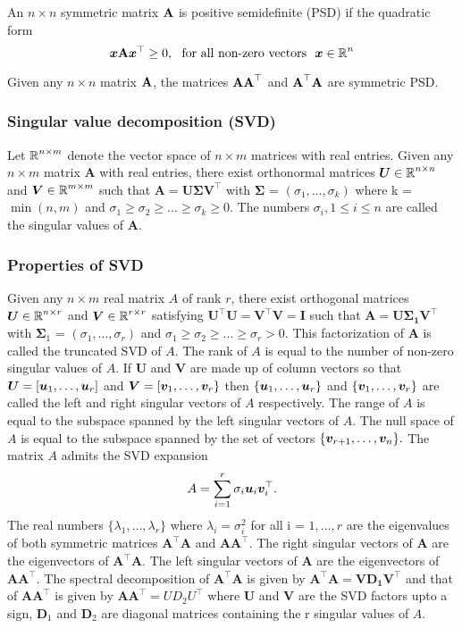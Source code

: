 An $n\times n$ symmetric matrix $\textbf{A}$ is positive semidefinite (PSD) if the quadratic form
\[
\vect{x} \Bm{A} \vect{x}^{\top} \geq 0,\ \ \text{for all non-zero vectors} \ \ \vect{x} \in \R^{n}
\]

Given any $n\times n$ matrix $\textbf{A}$, the matrices $\textbf{A}\textbf{A}^{\top}$
and $\textbf{A}^{\top}\textbf{A}$ are symmetric PSD.

\subsubsection{Singular value decomposition (SVD)}
Let $\operatorname{\mathbb{R}}^{n \times m}$ denote the vector space of $n \times m$ matrices with real entries. Given any $n\times m$ matrix $\bm{A}$ with real entries, there exist orthonormal matrices $\bm{U} \in \operatorname{\mathbb{R}}^{n \times n}$ and $\bm{V} \in \operatorname{\mathbb{R}}^{m \times m}$ such that 
$\bm{\displaystyle A = U \Sigma V^{\top}}$ with $\bm{\Sigma}$ = $(\sigma_{1}, \ldots, \sigma_{k})$ where  k = $\min(n, m)$ and
 $\sigma_{1} \geq \sigma_{2} \geq \ldots \geq \sigma_{k} \geq 0$.
The numbers $\sigma_{i}, 1\leq i\leq n$ are called the singular values of $\bm{A}$. 


\subsubsection{Properties of SVD}
Given any $n\times m$ real matrix $A$ of rank $r$, there exist  orthogonal matrices  $\bm{U} \in \operatorname{\mathbb{R}}^{n \times r}$ and $\bm{V} \in \operatorname{\mathbb{R}}^{r \times r}$ 
satisfying $\bm{U^{\top}U = V^{\top}V = I}$ such that $\bm{\text{A} = \text{U} \Sigma_{1} \text{V}^{\top}}$ with $\bm{\Sigma}_{1}$ = $(\sigma_{1}, \ldots, \sigma_{r})$ and $\sigma_{1} \geq \sigma_{2} \geq \ldots \geq \sigma_{r} > 0$.
This factorization of $\bm{A}$ is called the truncated SVD of $A$.
The rank of $A$ is equal to the number of non-zero singular values of $A$.
If $\bm{U}$ and $\bm{V}$ are made up of column vectors so that  $\bm{U} = [\boldsymbol{u}_1, \ldots, \boldsymbol{u}_{r}]$ and $\bm{V} = [\boldsymbol{v}_{1}, \ldots, \boldsymbol{v}_{r}\}$ then $\{ \boldsymbol{u}_1, \ldots, \boldsymbol{u}_{r} \}$  and $\{\boldsymbol{v}_{1}, \ldots, \boldsymbol{v}_{r} \}$ are called the left and right singular vectors of $A$ respectively. The range of $A$ is equal to the subspace spanned by the left singular vectors of $A$. The null space of $A$ is equal to the subspace spanned by the set of vectors $\{\boldsymbol{v}_{r+1}, \ldots, \boldsymbol{v}_{n} \}.$
The matrix $A$ admits the SVD expansion 
\[
A = \sum_{i=1}^{r} \sigma_{i} \boldsymbol{u}_{i} \boldsymbol{v}_{i}^{\top}.
\]
The real numbers $\{\lambda_{1}, \ldots, \lambda_{r}\}$ where $\lambda_{i} = \sigma_{i}^{2}$ for all i = $1 , \ldots, r$ are the eigenvalues of both symmetric matrices $\bm{A^{\top}A}$ and $\bm{AA^{\top}}.$ The right singular vectors of $\bm{A}$ are the eigenvectors of $\bm{A^{\top}A}.$ The left singular vectors of $\bm{A}$ are the eigenvectors of $\bm{AA^{\top}}.$ The spectral decomposition of $\bm{A^{\top}A}$ is given by $\bm{A^{\top}A  = V D_{1} V^{\top}}$ and that of  $\bm{AA^{\top}}$ is given by  $\bm{AA^{\top}} = U D_{2} U^{\top}$ where $\bm{U}$ and $\bm{V}$ are the SVD factors upto a sign, $\bm{D}_{1}$ and $\bm{D}_{2}$ are diagonal matrices containing the r singular values of $A$.

